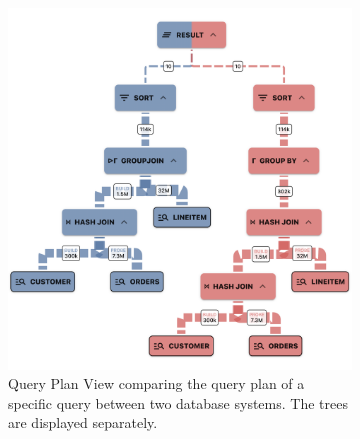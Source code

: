 \begin{figure}[h]
  \centering
  \begin{subfigure}[b]{0.5\linewidth}
    \includegraphics[width=\linewidth]{figures/query-plan-slim.png}
    \caption{Query Plan View comparing the query plan of a specific query between two database systems. The trees are displayed separately.}
      \label{fig:query-plan-basic}
  \end{subfigure}
  \hspace{1cm} %
  \begin{subfigure}[b]{0.4\linewidth}

\end{subfigure}
\end{figure}
